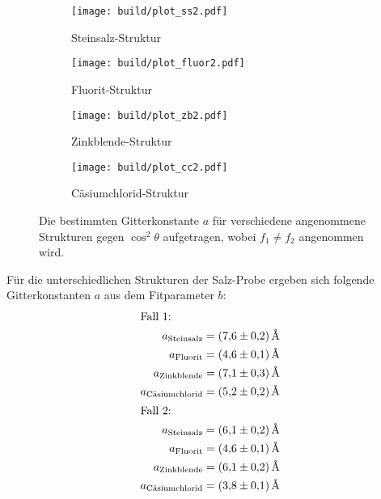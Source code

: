\begin{figure}[hhh]
  \centering
  \begin{subfigure}{.45\textwidth}
    \centering
    \texttt{[image: build/plot\_ss2.pdf]}
    \caption{Steinsalz-Struktur}
    \label{subfig:ss2}
  \end{subfigure}
  \begin{subfigure}{.45\textwidth}
    \centering
    \texttt{[image: build/plot\_fluor2.pdf]}
    \caption{Fluorit-Struktur}
    \label{subfig:fluo2}
  \end{subfigure}
  \begin{subfigure}{.45\textwidth}
    \centering
    \texttt{[image: build/plot\_zb2.pdf]}
    \caption{Zinkblende-Struktur}
    \label{subfig:zb2}
  \end{subfigure}
  \begin{subfigure}{.45\textwidth}
    \centering
    \texttt{[image: build/plot\_cc2.pdf]}
    \caption{Cäsiumchlorid-Struktur}
    \label{subfig:cc2}
  \end{subfigure}
  \caption{Die bestimmten Gitterkonstante $a$ für verschiedene angenommene Strukturen gegen $\cos^2\theta$ aufgetragen, wobei
  $f_1\neq f_2$ angenommen wird.}
  \label{fig:salz2}
\end{figure}
\FloatBarrier
Für die unterschiedlichen Strukturen der Salz-Probe ergeben sich folgende Gitterkonstanten $a$
aus dem Fitparameter $b$:
\begin{align*}
\intertext{Fall 1:}
a_{\text{Steinsalz}}&=\SI{7.6(2)}{\angstrom}\\
a_{\text{Fluorit}}&=\SI{4.6(1)}{\angstrom}\\
a_{\text{Zinkblende}}&=\SI{7.1(3)}{\angstrom}\\
a_{\text{Cäsiumchlorid}} &=\SI{5.2(2)}{\angstrom}\\
\intertext{Fall 2:}
a_{\text{Steinsalz}}&=\SI{6.1(2)}{\angstrom}\\
a_{\text{Fluorit}}&=\SI{4.6(1)}{\angstrom}\\
a_{\text{Zinkblende}}&=\SI{6.1(2)}{\angstrom}\\
a_{\text{Cäsiumchlorid}} &=\SI{3.8(1)}{\angstrom}
\end{align*}
